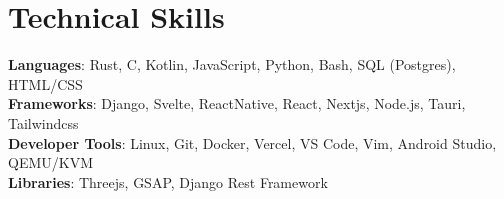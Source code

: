\documentclass[letterpaper,12pt]{article}
\begin{document}
%
\section{Technical Skills}
 \begin{itemize}[leftmargin=0.15in, label={}]
    \small{\item{
     \textbf{Languages}{: Rust, C, Kotlin, JavaScript, Python, Bash, SQL (Postgres), HTML/CSS} \\
     \textbf{Frameworks}{: Django, Svelte, ReactNative, React, Nextjs, Node.js, Tauri, Tailwindcss} \\
     \textbf{Developer Tools}{: Linux, Git, Docker, Vercel, VS Code, Vim, Android Studio, QEMU/KVM} \\
     \textbf{Libraries}{: Threejs, GSAP, Django Rest Framework} \\
    }}
 \end{itemize}


\end{document}
